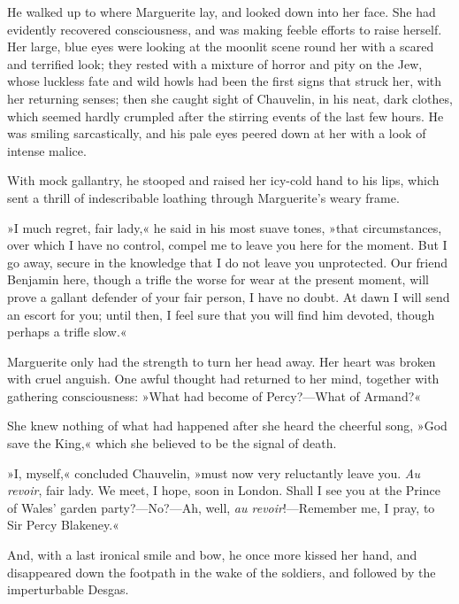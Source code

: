 He walked up to where Marguerite lay, and looked down into her face. She had evidently recovered consciousness, and was making feeble efforts to raise herself. Her large, blue eyes were looking at the moonlit scene round her with a scared and terrified look; they rested with a mixture of horror and pity on the Jew, whose luckless fate and wild howls had been the first signs that struck her, with her returning senses; then she caught sight of Chauvelin, in his neat, dark clothes, which seemed hardly crumpled after the stirring events of the last few hours. He was smiling sarcastically, and his pale eyes peered down at her with a look of intense malice.

With mock gallantry, he stooped and raised her icy-cold hand to his lips, which sent a thrill of indescribable loathing through Marguerite's weary frame.

»I much regret, fair lady,« he said in his most suave tones, »that circumstances, over which I have no control, compel me to leave you here for the moment. But I go away, secure in the knowledge that I do not leave you unprotected. Our friend Benjamin here, though a trifle the worse for wear at the present moment, will prove a gallant defender of your fair person, I have no doubt. At dawn I will send an escort for you; until then, I feel sure that you will find him devoted, though perhaps a trifle slow.«

Marguerite only had the strength to turn her head away. Her heart was broken with cruel anguish. One awful thought had returned to her mind, together with gathering consciousness: »What had become of Percy?—What of Armand?«

She knew nothing of what had happened after she heard the cheerful song, »God save the King,« which she believed to be the signal of death.

»I, myself,« concluded Chauvelin, »must now very reluctantly leave you. \textit{Au revoir}, fair lady. We meet, I hope, soon in London. Shall I see you at the Prince of Wales' garden party?—No?—Ah, well, \textit{au revoir}!—Remember me, I pray, to Sir Percy Blakeney.«

And, with a last ironical smile and bow, he once more kissed her hand, and disappeared down the footpath in the wake of the soldiers, and followed by the imperturbable Desgas.